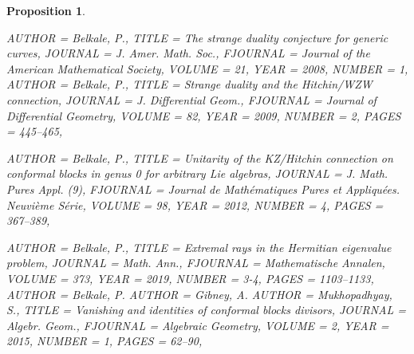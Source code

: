 \documentclass[11pt]{amsart}
\newtheorem{proposition}[theorem]{Proposition}
\numberwithin{theorem}{subsection}
\begin{document}
{\begin{proposition}
\begin{bibdiv}
\begin{biblist}
 {
    AUTHOR = {Belkale, P.},
     TITLE = {The strange duality conjecture for generic curves},
   JOURNAL = {J. Amer. Math. Soc.},
  FJOURNAL = {Journal of the American Mathematical Society},
    VOLUME = {21},
      YEAR = {2008},
    NUMBER = {1},
}
 {
    AUTHOR = {Belkale, P.},
     TITLE = {Strange duality and the {H}itchin/{WZW} connection},
   JOURNAL = {J. Differential Geom.},
  FJOURNAL = {Journal of Differential Geometry},
    VOLUME = {82},
      YEAR = {2009},
    NUMBER = {2},
     PAGES = {445--465},
}

{} {
    AUTHOR = {Belkale, P.},
     TITLE = {Unitarity of the {KZ}/{H}itchin connection on conformal blocks
              in genus 0 for arbitrary {L}ie algebras},
   JOURNAL = {J. Math. Pures Appl. (9)},
  FJOURNAL = {Journal de Math\'{e}matiques Pures et Appliqu\'{e}es. Neuvi\`eme S\'{e}rie},
    VOLUME = {98},
      YEAR = {2012},
    NUMBER = {4},
     PAGES = {367--389},
}
		
 {
    AUTHOR = {Belkale, P.},
     TITLE = {Extremal rays in the {H}ermitian eigenvalue problem},
   JOURNAL = {Math. Ann.},
  FJOURNAL = {Mathematische Annalen},
    VOLUME = {373},
      YEAR = {2019},
    NUMBER = {3-4},
     PAGES = {1103--1133},
}
 {
    AUTHOR = {Belkale, P.}
    AUTHOR = {Gibney, A.}
    AUTHOR = {Mukhopadhyay,
              S.},
     TITLE = {Vanishing and identities of conformal blocks divisors},
   JOURNAL = {Algebr. Geom.},
  FJOURNAL = {Algebraic Geometry},
    VOLUME = {2},
      YEAR = {2015},
    NUMBER = {1},
     PAGES = {62--90},
}



\end{biblist}
\end{bibdiv}
\end{proposition}}
\end{document}
